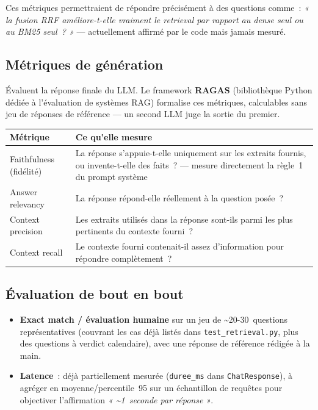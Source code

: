 \documentclass[11pt]{article}
\begin{document}
\vspace{0.5em}
Ces métriques permettraient de répondre précisément à des questions comme~: \textit{« la fusion
RRF améliore-t-elle vraiment le retrieval par rapport au dense seul ou au BM25 seul~? »} ---
actuellement affirmé par le code mais jamais mesuré.

\subsection{Métriques de génération}

Évaluent la réponse finale du LLM. Le framework \textbf{RAGAS} (bibliothèque Python dédiée à
l'évaluation de systèmes RAG) formalise ces métriques, calculables sans jeu de réponses de
référence --- un second LLM juge la sortie du premier.

\begin{tabularx}{\textwidth}{@{}l Y@{}}
\toprule
\textbf{Métrique} & \textbf{Ce qu'elle mesure} \\
\midrule
Faithfulness (fidélité) & La réponse s'appuie-t-elle uniquement sur les extraits fournis, ou invente-t-elle des faits~? --- mesure directement la règle~1 du prompt système \\
Answer relevancy & La réponse répond-elle réellement à la question posée~? \\
Context precision & Les extraits utilisés dans la réponse sont-ils parmi les plus pertinents du contexte fourni~? \\
Context recall & Le contexte fourni contenait-il assez d'information pour répondre complètement~? \\
\bottomrule
\end{tabularx}

\subsection{Évaluation de bout en bout}

\begin{itemize}
  \item \textbf{Exact match / évaluation humaine} sur un jeu de \textasciitilde20-30~questions
        représentatives (couvrant les cas déjà listés dans \texttt{test\_retrieval.py}, plus des
        questions à verdict calendaire), avec une réponse de référence rédigée à la main.
  \item \textbf{Latence}~: déjà partiellement mesurée (\texttt{duree\_ms} dans
        \texttt{ChatResponse}), à agréger en moyenne/percentile~95 sur un échantillon de requêtes
        pour objectiver l'affirmation \textit{« \textasciitilde1~seconde par réponse »}.
\end{itemize}
\end{document}
